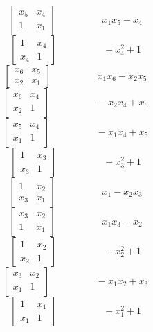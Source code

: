 \documentclass[12pt]{article}
\begin{document}
$$\left[\begin{matrix}x_{5} & x_{4}\\1 & x_{1}\end{matrix}\right] \hspace{2cm} x_{1} x_{5} - x_{4}$$
$$\left[\begin{matrix}1 & x_{4}\\x_{4} & 1\end{matrix}\right] \hspace{2cm} - x_{4}^{2} + 1$$
$$\left[\begin{matrix}x_{6} & x_{5}\\x_{2} & x_{1}\end{matrix}\right] \hspace{2cm} x_{1} x_{6} - x_{2} x_{5}$$
$$\left[\begin{matrix}x_{6} & x_{4}\\x_{2} & 1\end{matrix}\right] \hspace{2cm} - x_{2} x_{4} + x_{6}$$
$$\left[\begin{matrix}x_{5} & x_{4}\\x_{1} & 1\end{matrix}\right] \hspace{2cm} - x_{1} x_{4} + x_{5}$$
$$\left[\begin{matrix}1 & x_{3}\\x_{3} & 1\end{matrix}\right] \hspace{2cm} - x_{3}^{2} + 1$$
$$\left[\begin{matrix}1 & x_{2}\\x_{3} & x_{1}\end{matrix}\right] \hspace{2cm} x_{1} - x_{2} x_{3}$$
$$\left[\begin{matrix}x_{3} & x_{2}\\1 & x_{1}\end{matrix}\right] \hspace{2cm} x_{1} x_{3} - x_{2}$$
$$\left[\begin{matrix}1 & x_{2}\\x_{2} & 1\end{matrix}\right] \hspace{2cm} - x_{2}^{2} + 1$$
$$\left[\begin{matrix}x_{3} & x_{2}\\x_{1} & 1\end{matrix}\right] \hspace{2cm} - x_{1} x_{2} + x_{3}$$
$$\left[\begin{matrix}1 & x_{1}\\x_{1} & 1\end{matrix}\right] \hspace{2cm} - x_{1}^{2} + 1$$
\end{document}
